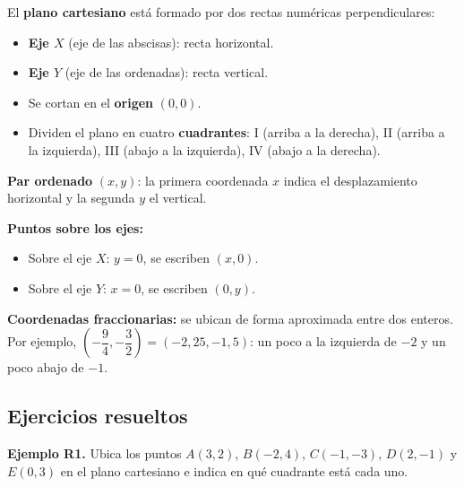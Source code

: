 \documentclass[12pt, letterpaper]{article}
\begin{document}
\begin{cuadroteoria}
  El \textbf{plano cartesiano} está formado por dos rectas numéricas perpendiculares:
  \begin{itemize}[leftmargin=*]
    \item \textbf{Eje $X$} (eje de las abscisas): recta horizontal.
    \item \textbf{Eje $Y$} (eje de las ordenadas): recta vertical.
    \item Se cortan en el \textbf{origen} $(0, 0)$.
    \item Dividen el plano en cuatro \textbf{cuadrantes}: I (arriba a la derecha), II (arriba a la izquierda), III (abajo a la izquierda), IV (abajo a la derecha).
  \end{itemize}

  \textbf{Par ordenado} $(x, y)$: la primera coordenada $x$ indica el desplazamiento horizontal y la segunda $y$ el vertical.
\end{cuadroteoria}
\newpage
\begin{cuadroteoria}
  \textbf{Puntos sobre los ejes:}
  \begin{itemize}[leftmargin=*]
    \item Sobre el eje $X$: $y = 0$, se escriben $(x, 0)$.
    \item Sobre el eje $Y$: $x = 0$, se escriben $(0, y)$.
  \end{itemize}

  \textbf{Coordenadas fraccionarias:} se ubican de forma aproximada entre dos enteros. Por ejemplo, $\left(-\dfrac{9}{4}, -\dfrac{3}{2}\right) = (-2{,}25, -1{,}5)$: un poco a la izquierda de $-2$ y un poco abajo de $-1$.
\end{cuadroteoria}

\subsection{Ejercicios resueltos}

\textbf{Ejemplo R1.} Ubica los puntos $A(3, 2)$, $B(-2, 4)$, $C(-1, -3)$, $D(2, -1)$ y $E(0, 3)$ en el plano cartesiano e indica en qué cuadrante está cada uno.
\end{document}
